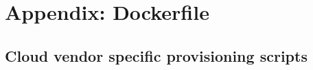  
\chapter[Appendix: Dockerfile]{Appendix: Dockerfile}\label{app:dockerfile}




\section{Cloud vendor specific provisioning scripts}


